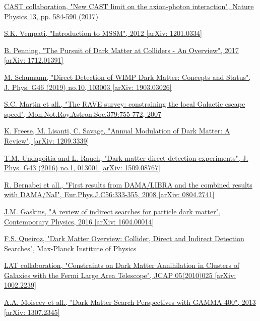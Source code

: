 \documentclass[a4paper, 10pt, openright]{report}
\begin{document}
\begin{thebibliography}{1}
\href{https://www.nature.com/articles/nphys4109}{CAST collaboration,
"New CAST limit on the axion-photon interaction",
Nature Physics 13, pp. 584-590 (2017)
}

\href{https://arxiv.org/abs/1201.0334}{S.K. Vempati,
"Introduction to MSSM",
2012 [arXiv: 1201.0334]}

\href{https://arxiv.org/abs/1712.01391}{B. Penning,
"The Pursuit of Dark Matter at Colliders - An Overview",
2017 [arXiv: 1712.01391]
}

\href{https://arxiv.org/abs/1903.03026}{M. Schumann,
"Direct Detection of WIMP Dark Matter: Concepts and Status",
J. Phys. G46 (2019) no.10, 103003 [arXiv: 1903.03026]
}

\href{https://arxiv.org/abs/astro-ph/0611671}{S.C. Martin et all.,
"The RAVE survey: constraining the local Galactic escape speed",
Mon.Not.Roy.Astron.Soc.379:755-772, 2007
}

\href{https://arxiv.org/abs/1209.3339}{K. Freese, M. Lisanti, C. Savage,
"Annual Modulation of Dark Matter: A Review",
[arXiv: 1209.3339]
}

\href{https://arxiv.org/abs/1509.08767}{T.M. Undagoitia and L. Rauch,
"Dark matter direct-detection experiments",
J. Phys. G43 (2016) no.1, 013001 [arXiv: 1509.08767]
}

\href{https://arxiv.org/abs/0804.2741}{R. Bernabei et all.,
"First results from DAMA/LIBRA and the combined results with DAMA/NaI",
Eur.Phys.J.C56:333-355, 2008 [arXiv: 0804.2741]
}

\href{https://arxiv.org/pdf/1604.00014}{J.M. Gaskins,
"A review of indirect searches for particle dark matter",
Contemporary Physics, 2016 [arXiv: 1604.00014]
}

\href{http://inspirehep.net/record/1466249/files/1589812_427-436.pdf}{F.S. Queiroz,
"Dark Matter Overview: Collider, Direct and Indirect Detection Searches",
Max-Planck Institute of Physics
}

\href{https://arxiv.org/pdf/1106.3416.pdf}{LAT collaboration,
"Constraints on Dark Matter Annihilation in Clusters of Galaxies with the Fermi Large Area Telescope",
JCAP 05(2010)025 [arXiv: 1002.2239]
}

\href{https://arxiv.org/abs/1307.2345}{A.A. Moiseev et all.,
"Dark Matter Search Perspectives with GAMMA-400",
2013 [arXiv: 1307.2345]
}


\end{thebibliography}
\end{document}
